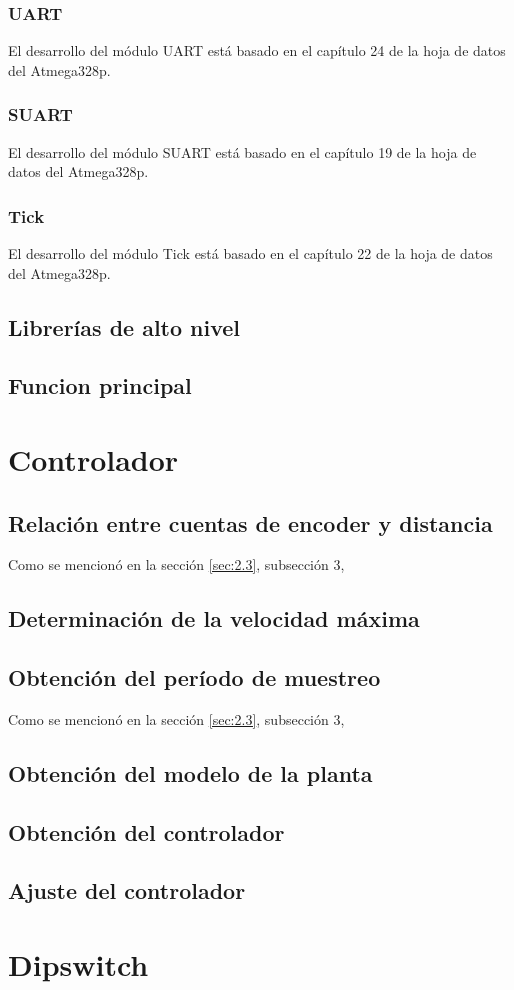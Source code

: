 \subsubsection{UART}
El desarrollo del módulo UART está basado en el capítulo 24 de la hoja de datos del Atmega328p.

\subsubsection{SUART}
El desarrollo del módulo SUART está basado en el capítulo 19 de la hoja de datos del Atmega328p.

\subsubsection{Tick}
El desarrollo del módulo Tick está basado en el capítulo 22 de la hoja de datos del Atmega328p.

\subsection{Librerías de alto nivel}

\subsection{Funcion principal}

\section{Controlador} \label{sec:\thesection}

\subsection{Relación entre cuentas de encoder y distancia}
Como se mencionó en la sección \ref{sec:2.3}, subsección 3, 

\subsection{Determinación de la velocidad máxima}

\subsection{Obtención del período de muestreo}
Como se mencionó en la sección \ref{sec:2.3}, subsección 3, 

\subsection{Obtención del modelo de la planta}

\subsection{Obtención del controlador}

\subsection{Ajuste del controlador}


\section{Dipswitch} \label{sec:\thesection}


